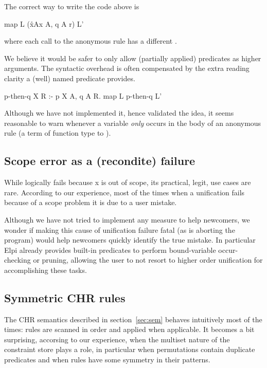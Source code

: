 \documentclass[a4paper, 11pt]{book}
\begin{document}
The correct way to write the code above is
\begin{elpicode}
map L (x\r\sigma A\p x A, q A r) L'
\end{elpicode}
where each
call to the anonymous rule has a different .

We believe it would be safer to only allow (partially
applied) predicates as higher arguments.
The syntactic overhead is often compensated by the extra
reading clarity a (well) named predicate provides.

\begin{elpicode}
p-then-q X R :- p X A, q A R.
map L p-then-q L'
\end{elpicode}  

Although we have not implemented it, hence validated the idea,
it seems reasonable to warn whenever a variable \emph{only} occurs
in the body of an anonymous rule (a term of function type to ).

\subsection{Scope error as a (recondite) failure}

While  logically fails because x is
out of scope, its practical, legit, use cases are rare.
According to our experience, most of the times when a
unification fails because of
a scope problem it is due to a user mistake.

Although we have not tried to implement any measure to help
newcomers, we wonder if making this cause of unification failure
fatal (as is aborting the program) would help newcomers quickly
identify the true mistake. In particular Elpi already provides
built-in predicates to perform bound-variable occur-checking
or pruning, allowing the user to not resort to higher order
unification for accomplishing these tasks.

\subsection{Symmetric CHR rules}

The CHR semantics described in section~\ref{sec:sem} behaves intuitively most of
the times: rules
are scanned in order and applied when applicable. It becomes a bit surprising,
accorsing to our experience, when the multiset nature of the constraint store
plays a role, in particular when permutations contain duplicate predicates
and when rules have some symmetry in their patterns.
\end{document}

